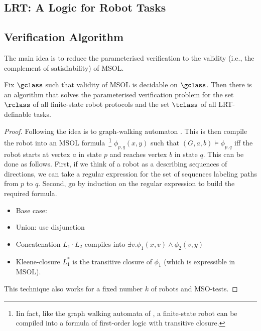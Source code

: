 \subsection{LRT: A Logic for Robot Tasks}





\subsection{Verification Algorithm}

The main idea is to reduce the parameterised verification to the validity (i.e.,
the complement of satisfiability) of MSOL.

\begin{theorem}
Fix $\gclass$ such that validity of MSOL is decidable on $\gclass$. Then there
is an algorithm that solves the parameterised verification problem for the set
$\rclass$ of all finite-state robot protocols and the set $\tclass$ of all
LRT-definable tasks.
\end{theorem}

\begin{proof}
Following \cite{BlEn97,EnHo06} the idea is to %
graph-walking automaton \cite{BlEn97}. This is then
compile the robot into an MSOL formula~\footnote{Iin fact, like the graph
walking automata of \cite{BlEn97,EnHo06}, a finite-state robot can be compiled
into a formula of first-order logic with transitive closure.} $\phi_{p,q}(x,y)$
such that $(G,a,b) \models \phi_{p,q}$ iff the robot starts at vertex $a$ in
state $p$ and reaches vertex $b$ in state $q$. This can be done as follows.
First, if we think of a robot as a describing sequences of directions, we can
take a regular expression for the set of sequences labeling paths from $p$ to
$q$. Second, go by induction on the regular expression to build the required
formula.

\begin{itemize}
\item Base case:

\item Union: use disjunction

\item Concatenation $L_1 \cdot L_2$ compiles into $\exists v. \phi_1(x,v) \wedge
\phi_2(v,y)$

\item Kleene-closure $L_1^*$ is the transitive closure of $\phi_1$ (which is
expressible in MSOL).
\end{itemize}

This technique also works for a fixed number $k$ of robots and
MSO-tests.
\end{proof}

